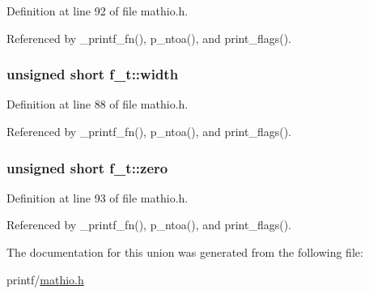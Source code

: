 Definition at line 92 of file mathio.\+h.



Referenced by \+\_\+printf\+\_\+fn(), p\+\_\+ntoa(), and print\+\_\+flags().

\subsubsection[{\texorpdfstring{width}{width}}]{\setlength{\rightskip}{0pt plus 5cm}unsigned short f\+\_\+t\+::width}\hypertarget{unionf__t_ad6b1584314c27653690552e95e1ed96f}{}\label{unionf__t_ad6b1584314c27653690552e95e1ed96f}


Definition at line 88 of file mathio.\+h.



Referenced by \+\_\+printf\+\_\+fn(), p\+\_\+ntoa(), and print\+\_\+flags().

\subsubsection[{\texorpdfstring{zero}{zero}}]{\setlength{\rightskip}{0pt plus 5cm}unsigned short f\+\_\+t\+::zero}\hypertarget{unionf__t_ac70397e87721255908299c190f3e5670}{}\label{unionf__t_ac70397e87721255908299c190f3e5670}


Definition at line 93 of file mathio.\+h.



Referenced by \+\_\+printf\+\_\+fn(), p\+\_\+ntoa(), and print\+\_\+flags().



The documentation for this union was generated from the following file\+:\begin{DoxyCompactItemize}
\item 
printf/\hyperlink{mathio_8h}{mathio.\+h}\end{DoxyCompactItemize}
